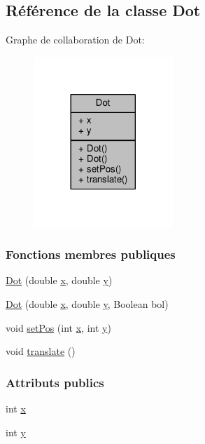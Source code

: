 \hypertarget{classDot}{}\subsection{Référence de la classe Dot}
\label{classDot}


Graphe de collaboration de Dot\+:\nopagebreak
\begin{figure}[H]
\begin{center}
\leavevmode
\includegraphics[width=149pt]{classDot__coll__graph}
\end{center}
\end{figure}
\subsubsection*{Fonctions membres publiques}
\begin{DoxyCompactItemize}
\item 
\hyperlink{classDot_ad7c02a05038699cfc7032f5a3c5340be}{Dot} (double \hyperlink{classDot_a2e1474ff16b86ce856a9f49d84a240d5}{x}, double \hyperlink{classDot_a17f640ad7b65953a11f602d0a8c6d162}{y})
\item 
\hyperlink{classDot_a04a7143246de78c09e00ff8ee3bb858a}{Dot} (double \hyperlink{classDot_a2e1474ff16b86ce856a9f49d84a240d5}{x}, double \hyperlink{classDot_a17f640ad7b65953a11f602d0a8c6d162}{y}, Boolean bol)
\item 
void \hyperlink{classDot_a59dbdc958aca411e9246125fb2b0e111}{set\+Pos} (int \hyperlink{classDot_a2e1474ff16b86ce856a9f49d84a240d5}{x}, int \hyperlink{classDot_a17f640ad7b65953a11f602d0a8c6d162}{y})
\item 
void \hyperlink{classDot_a06923e301e9bbf182833b1c4914f8d7d}{translate} ()
\end{DoxyCompactItemize}
\subsubsection*{Attributs publics}
\begin{DoxyCompactItemize}
\item 
int \hyperlink{classDot_a2e1474ff16b86ce856a9f49d84a240d5}{x}
\item 
int \hyperlink{classDot_a17f640ad7b65953a11f602d0a8c6d162}{y}
\end{DoxyCompactItemize}


